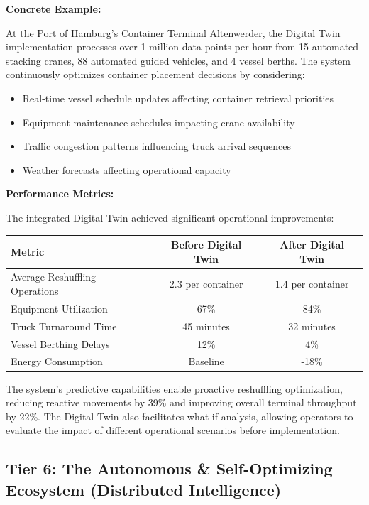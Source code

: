 \documentclass{article}
\begin{document}
\textbf{Concrete Example:}

At the Port of Hamburg's Container Terminal Altenwerder, the Digital Twin implementation processes over 1 million data points per hour from 15 automated stacking cranes, 88 automated guided vehicles, and 4 vessel berths. The system continuously optimizes container placement decisions by considering:

\begin{itemize}
\item Real-time vessel schedule updates affecting container retrieval priorities
\item Equipment maintenance schedules impacting crane availability
\item Traffic congestion patterns influencing truck arrival sequences
\item Weather forecasts affecting operational capacity
\end{itemize}

\textbf{Performance Metrics:}

The integrated Digital Twin achieved significant operational improvements:

\begin{center}
\begin{tabular}{lcc}
\toprule
Metric & Before Digital Twin & After Digital Twin \\
\midrule
Average Reshuffling Operations & 2.3 per container & 1.4 per container \\
Equipment Utilization & 67\% & 84\% \\
Truck Turnaround Time & 45 minutes & 32 minutes \\
Vessel Berthing Delays & 12\% & 4\% \\
Energy Consumption & Baseline & -18\% \\
\bottomrule
\end{tabular}
\end{center}

The system's predictive capabilities enable proactive reshuffling optimization, reducing reactive movements by 39\% and improving overall terminal throughput by 22\%. The Digital Twin also facilitates what-if analysis, allowing operators to evaluate the impact of different operational scenarios before implementation.

\subsection{Tier 6: The Autonomous \& Self-Optimizing Ecosystem (Distributed Intelligence)}
\end{document}
